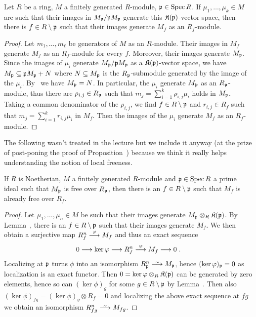 \documentclass[a4paper,parskip=half,numbers=enddot, DIV=12]{scrreprt}
\begin{document}
\begin{lem}
    Let $R$ be a ring, $M$ a finitely generated $R$-module, $\mathfrak{p}\in \operatorname{Spec} R$. If $\mu_1,\ldots,\mu_k\in M$ are such that their images in $M_{\mathfrak{p}}/\mathfrak{p} M_{\mathfrak{p}}$ generate this $\mathfrak{K}(\mathfrak{p})$-vector space, then there is $f\in R\setminus \mathfrak{p}$ such that their images generate $M_f$ as an $R_f$-module.
\end{lem}
\begin{proof}
    Let $m_1,\ldots, m_\ell$ be generators of $M$ as an $R$-module. Their images in $M_f$ generate $M_f$ as an $R_f$-module for every $f$. Moreover, their images generate $M_{\mathfrak{p}}$. Since the images of $\mu_i$ generate $M_{\mathfrak{p}}/\mathfrak{p} M_{\mathfrak{p}}$ as a $\mathfrak{K}(\mathfrak{p})$-vector space, we have $M_{\mathfrak{p}} \subseteq \mathfrak{p} M_{\mathfrak{p}} +N$ where $N\subseteq M_{\mathfrak{p}}$ is the $R_{\mathfrak{p}}$-submodule generated by the image of the $\mu_i$. By \NAK\ we have $M_{\mathfrak{p}}=N$. In particular, the $\mu_i$ generate $M_{\mathfrak{p}}$ as an $R_{\mathfrak{p}}$-module, thus there are $\rho_{i,j}\in R_{\mathfrak{p}}$ such that $m_j = \sum_{i=1}^k \rho_{i,j} \mu_i$ holds in $M_{\mathfrak{p}}$. Taking a common denominator of the $\rho_{i,j}$, we find $f\in R\setminus \mathfrak{p}$ and $r_{i,j}\in R_f$ such that $m_j = \sum_{i=1}^k r_{i,j}\mu_i$ in $M_f$. Then the images of the $\mu_i$ generate $M_f$ as an $R_f$-module.
\end{proof}
The following wasn't treated in the lecture but we include it anyway (at the prize of post-poning the proof of Proposition~) because we think it really helps understanding the notion of local freeness.
\begin{cor}
	If $R$ is Noetherian, $M$ a finitely generated $R$-module and $\mathfrak{p}\in\operatorname{Spec} R$ a prime ideal such that $M_{\mathfrak{p}}$ is free over $R_{\mathfrak{p}}$, then there is an $f\in R\setminus \mathfrak{p}$ such that $M_f$ is already free over $R_f$.
\end{cor}
\begin{proof}
	Let $\mu_1,\ldots,\mu_n\in M$ be such that their images generate $M_{\mathfrak{p}}\otimes_R\mathfrak{K}(\mathfrak{p})$. By Lemma~, there is an $f\in R\setminus \mathfrak{p}$ such that their images generate $M_f$. We then obtain a surjective map $R_f^n\morphism[\phi]M_f$ and thus an exact sequence
	\begin{align*}
		0\morphism\ker\phi\morphism R_f^n\morphism[\phi]M_f\morphism 0\;.
	\end{align*}
	Localizing at $\mathfrak{p}$ turns $\phi$ into an isomorphism $R_\pp^n\isomorphism M_\pp$, hence $(\ker\varphi)_{\mathfrak{p}}=0$ as localization is an exact functor. Then $0=\ker\varphi\otimes_R\mathfrak{K}(\mathfrak{p})$ can be generated by zero elements, hence so can $(\ker\phi)_g$ for some $g\in R\setminus \mathfrak{p}$ by Lemma~. Then also $(\ker\phi)_{fg}=(\ker\phi)_g\otimes R_f=0$ and localizing the above exact sequence at $fg$ we obtain an isomorphism $R_{fg}^n\isomorphism M_{fg}$.
\end{proof}
\end{document}
